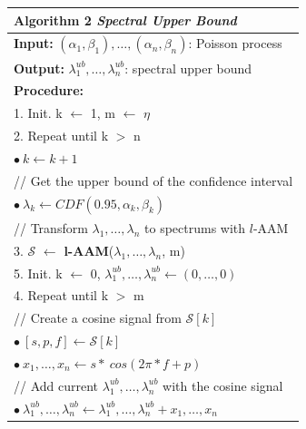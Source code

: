 \begin{figure}[t!]
	\begin{center}
		\begin{tabular*}{0.5\textwidth}{l @{\extracolsep{\fill}}}
			\hline
			\textbf{Algorithm 2} \textit{Spectral Upper Bound} \\
			\hline
			\textbf{Input:} $(\alpha_1, \beta_1), \ldots, (\alpha_n, \beta_n)$: Poisson process \\
			\textbf{Output:} $\lambda^{ub}_1, \ldots, \lambda^{ub}_n$: spectral upper bound \\
			\textbf{Procedure:}\\
			\hspace{0.3cm} 1. Init. k $\leftarrow$ 1, m $\leftarrow$ $\eta$ \\
			\hspace{0.3cm} 2. Repeat until k $>$ n \\
			\hspace{0.7cm} $\bullet ~ k \leftarrow k + 1$ \\
			\hspace{0.7cm} // Get the upper bound of the confidence interval \\
			\hspace{0.7cm} $\bullet ~ \lambda_k \leftarrow CDF(0.95, \alpha_k, \beta_k)$ \\
			\hspace{0.3cm} // Transform $\lambda_1, \ldots, \lambda_n$ to spectrums with $l$-AAM \\
			\hspace{0.3cm} 3. $\mathcal S$ $\leftarrow$ \textbf{l-AAM}($\lambda_1, \ldots, \lambda_n$, m) \\
			\hspace{0.3cm} 5. Init. k $\leftarrow$ 0,  $\lambda^{ub}_1, \ldots, \lambda^{ub}_n \leftarrow (0, \ldots, 0)$ \\
			\hspace{0.3cm} 4. Repeat until k $>$ m \\
			\hspace{0.7cm} // Create a cosine signal from $\mathcal S[k]$ \\
			\hspace{0.7cm} $\bullet ~ [s, p, f] \leftarrow \mathcal S[k]$ \\
			\hspace{0.7cm} $\bullet ~ x_1, \ldots, x_n \leftarrow s * ~ cos(2 \pi * f + p)$ \\
			\hspace{0.7cm} // Add current $\lambda^{ub}_1, \ldots, \lambda^{ub}_n$ with the cosine signal \\
			\hspace{0.7cm} $\bullet ~ \lambda^{ub}_1, \ldots, \lambda^{ub}_n \leftarrow \lambda^{ub}_1, \ldots, \lambda^{ub}_n + x_1, \ldots, x_n$ \\
			\hline
		\end{tabular*}	
	\end{center}
\end{figure} 

